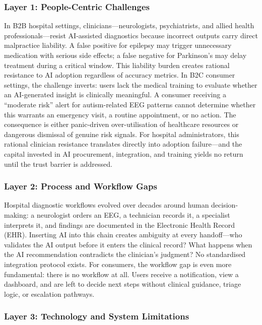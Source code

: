 \iffalse %
\subsubsection{Layer 1: People-Centric Challenges}

In B2B hospital settings, clinicians---neurologists, psychiatrists, and allied health professionals---resist AI-assisted diagnostics because incorrect outputs carry direct malpractice liability. A false positive for epilepsy may trigger unnecessary medication with serious side effects; a false negative for Parkinson's may delay treatment during a critical window. This liability burden creates rational resistance to AI adoption regardless of accuracy metrics. In B2C consumer settings, the challenge inverts: users lack the medical training to evaluate whether an AI-generated insight is clinically meaningful. A consumer receiving a ``moderate risk'' alert for autism-related EEG patterns cannot determine whether this warrants an emergency visit, a routine appointment, or no action. The consequence is either panic-driven over-utilisation of healthcare resources or dangerous dismissal of genuine risk signals. For hospital administrators, this rational clinician resistance translates directly into adoption failure---and the capital invested in AI procurement, integration, and training yields no return until the trust barrier is addressed.

\subsubsection{Layer 2: Process and Workflow Gaps}

Hospital diagnostic workflows evolved over decades around human decision-making: a neurologist orders an EEG, a technician records it, a specialist interprets it, and findings are documented in the Electronic Health Record (EHR). Inserting AI into this chain creates ambiguity at every handoff---who validates the AI output before it enters the clinical record? What happens when the AI recommendation contradicts the clinician's judgment? No standardised integration protocol exists. For consumers, the workflow gap is even more fundamental: there is no workflow at all. Users receive a notification, view a dashboard, and are left to decide next steps without clinical guidance, triage logic, or escalation pathways.

\subsubsection{Layer 3: Technology and System Limitations}

